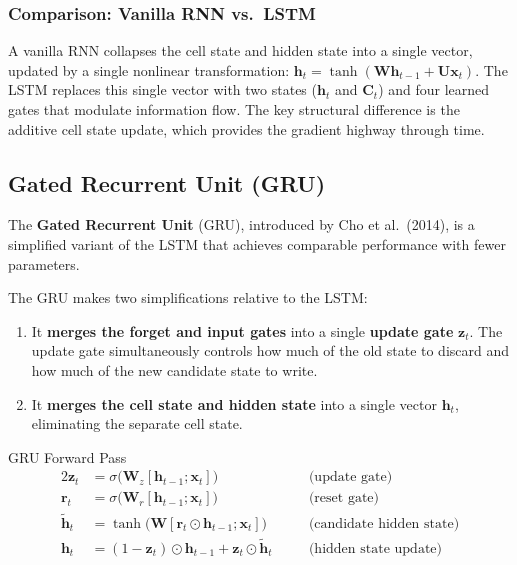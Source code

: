 \documentclass[11pt,a4paper]{article}
\newcommand{\term}[1]{\textcolor{DefGreen}{\textbf{#1}}}
\begin{document}
\subsubsection{Comparison: Vanilla RNN vs.\ LSTM}

A vanilla RNN collapses the cell state and hidden state into a single vector, updated by a single nonlinear transformation: $\mathbf{h}_t = \tanh(\mathbf{W}\mathbf{h}_{t-1} + \mathbf{U}\mathbf{x}_t)$. The LSTM replaces this single vector with two states ($\mathbf{h}_t$ and $\mathbf{C}_t$) and four learned gates that modulate information flow. The key structural difference is the additive cell state update, which provides the gradient highway through time.

\subsection{Gated Recurrent Unit (GRU)}
\label{sec:gru}

The \term{Gated Recurrent Unit} (GRU), introduced by Cho et al.\ (2014), is a simplified variant of the LSTM that achieves comparable performance with fewer parameters.

The GRU makes two simplifications relative to the LSTM:
\begin{enumerate}
  \item It \textbf{merges the forget and input gates} into a single \term{update gate} $\mathbf{z}_t$. The update gate simultaneously controls how much of the old state to discard and how much of the new candidate state to write.
  \item It \textbf{merges the cell state and hidden state} into a single vector $\mathbf{h}_t$, eliminating the separate cell state.
\end{enumerate}

\begin{defbox}{GRU Forward Pass}
\begin{alignat}{2}
  \mathbf{z}_t &= \sigma\!\bigl(\mathbf{W}_z[\mathbf{h}_{t-1};\mathbf{x}_t]\bigr)
    &&\quad\text{(update gate)}\\[3pt]
  \mathbf{r}_t &= \sigma\!\bigl(\mathbf{W}_r[\mathbf{h}_{t-1};\mathbf{x}_t]\bigr)
    &&\quad\text{(reset gate)}\\[3pt]
  \tilde{\mathbf{h}}_t &= \tanh\!\bigl(\mathbf{W}[\mathbf{r}_t \odot \mathbf{h}_{t-1};\mathbf{x}_t]\bigr)
    &&\quad\text{(candidate hidden state)}\\[3pt]
  \mathbf{h}_t &= (1-\mathbf{z}_t) \odot \mathbf{h}_{t-1} + \mathbf{z}_t \odot \tilde{\mathbf{h}}_t
    &&\quad\text{(hidden state update)}
\end{alignat}
\end{defbox}
\end{document}
